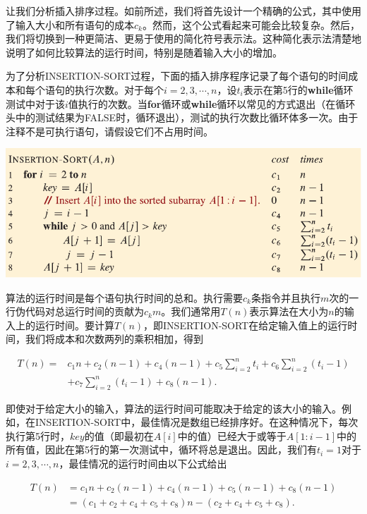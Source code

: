 \documentclass[lang=cn,newtx,10pt,scheme=chinese]{elegantbook}
\begin{document}
让我们分析插入排序过程。如前所述，我们将首先设计一个精确的公式，其中使用了输入大小和所有语句的成本$c_k$。然而，这个公式看起来可能会比较复杂。然后，我们将切换到一种更简洁、更易于使用的简化符号表示法。这种简化表示法清楚地说明了如何比较算法的运行时间，特别是随着输入大小的增加。

为了分析INSERTION-SORT过程，下面的插入排序程序记录了每个语句的时间成本和每个语句的执行次数。对于每个$i=2,3,\cdots,n$，设$t_i$表示在第5行的\textbf{while}循环测试中对于该$i$值执行的次数。当\textbf{for}循环或\textbf{while}循环以常见的方式退出（在循环头中的测试结果为FALSE时，循环退出），测试的执行次数比循环体多一次。由于注释不是可执行语句，请假设它们不占用时间。

\includegraphics{算法导论第四版插图/第二章/插入排序时间复杂度的代码.pdf}

算法的运行时间是每个语句执行时间的总和。执行需要$c_k$条指令并且执行$m$次的一行伪代码对总运行时间的贡献为$c_km$。我们通常用$T(n)$表示算法在大小为$n$的输入上的运行时间。要计算$T(n)$，即INSERTION-SORT在给定输入值上的运行时间，我们将成本和次数两列的乘积相加，得到

\begin{equation*}
\begin{aligned}
T(n)= & c_1 n+c_2(n-1)+c_4(n-1)+c_5 \sum_{i=2}^n t_i+c_6 \sum_{i=2}^n\left(t_i-1\right) \\
& +c_7 \sum_{i=2}^n\left(t_i-1\right)+c_8(n-1) .
\end{aligned}
\end{equation*}

即使对于给定大小的输入，算法的运行时间可能取决于给定的该大小的输入。例如，在INSERTION-SORT中，最佳情况是数组已经排序好。在这种情况下，每次执行第5行时，$key$的值（即最初在$A[i]$中的值）已经大于或等于$A[1:i-1]$中的所有值，因此在第5行的第一次测试中，循环将总是退出。因此，我们有$t_i=1$对于$i=2,3,\cdots,n$，最佳情况的运行时间由以下公式给出

\begin{equation}
\begin{aligned}
T(n) & =c_1 n+c_2(n-1)+c_4(n-1)+c_5(n-1)+c_8(n-1) \\
& =\left(c_1+c_2+c_4+c_5+c_8\right) n-\left(c_2+c_4+c_5+c_8\right) .
\end{aligned}
\end{equation}
\end{document}

